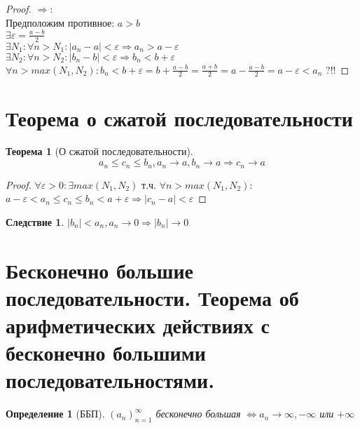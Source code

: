 \documentclass[11pt,a4paper,titlepage]{article}
\newtheorem*{theorem}{Теорема}
\newtheorem*{corollary}{Следствие}
\newtheorem*{definition}{Определение}
\renewcommand{\implies}{\Rightarrow}
\renewcommand{\iff}{\Leftrightarrow}
\renewcommand{\epsilon}{\varepsilon}
\begin{document}
    \begin{proof}
        $\implies:$\\
        Предположим противное: $a > b$\\
        $\exists \epsilon = \frac{a-b}{2}$\\
        $\exists N_1: \forall n > N_1: |a_n - a| <
        \epsilon \implies a_n > a - \epsilon $\\
        $\exists N_2: \forall n > N_2: |b_n - b| <
        \epsilon \implies b_n < b + \epsilon $\\
        $\forall n > max(N_1, N_2): b_n<b+\epsilon=b+\frac{a-b}{2}=\frac{a+b}{2}=a-\frac{a-b}{2}=a-\epsilon<a_n$ ?!!
    \end{proof}


    \section{Теорема о сжатой последовательности}

    \begin{theorem}[О сжатой последовательности]
        \[a_n \leq c_n \leq b_n, a_n \to a, b_n \to a \implies c_n \to a\]
    \end{theorem}

    \begin{proof}
        $\forall \epsilon > 0: \exists max(N_1, N_2)$ т.ч. $\forall n > max(N_1, N_2):$\\
        $ a-\epsilon < a_n \leq c_n \leq b_n < a + \epsilon \implies |c_n - a| < \epsilon$
    \end{proof}

    \begin{corollary}
        $|b_n| < a_n, a_n \to 0 \implies |b_n| \to 0$
    \end{corollary}


    \section{Бесконечно большие последовательности. Теорема об арифметических действиях с бесконечно большими последовательностями.}

    \begin{definition}[ББП]
        $(a_n)_{n=1}^\infty$ бесконечно большая $\iff a_n \to \infty, -\infty$ или $+\infty$
    \end{definition}
\end{document}

